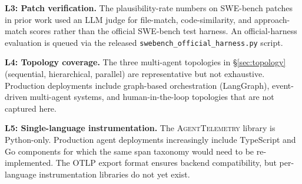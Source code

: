\documentclass[11pt]{article}
\begin{document}
\textbf{L3: Patch verification.} The plausibility-rate numbers on
SWE-bench patches in prior work used an LLM judge for file-match,
code-similarity, and approach-match scores rather than the official
SWE-bench test harness. An official-harness evaluation is queued via
the released \texttt{swebench\_official\_harness.py} script.

\textbf{L4: Topology coverage.} The three multi-agent topologies in
\S\ref{sec:topology} (sequential, hierarchical, parallel) are
representative but not exhaustive. Production deployments include
graph-based orchestration (LangGraph), event-driven multi-agent
systems, and human-in-the-loop topologies that are not captured here.

\textbf{L5: Single-language instrumentation.} The
\textsc{AgentTelemetry} library is Python-only. Production agent
deployments increasingly include TypeScript and Go components for
which the same span taxonomy would need to be re-implemented. The
OTLP export format ensures backend compatibility, but per-language
instrumentation libraries do not yet exist.



\end{document}
